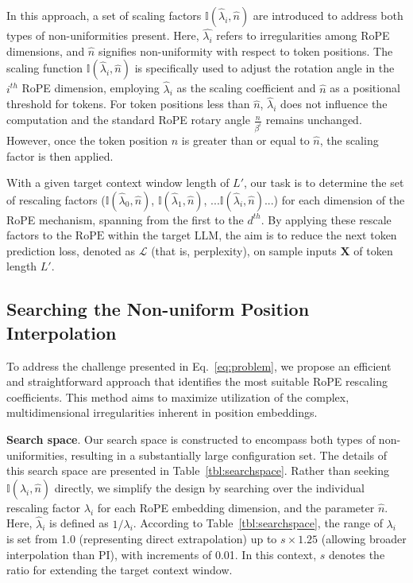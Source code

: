 In this approach, a set of scaling factors $\mathbb{I}(\hat{\lambda}_{i},\hat{n})$ are introduced to address both types of non-uniformities present. Here, $\hat{\lambda_i}$ refers to irregularities among RoPE dimensions, and $\hat{n}$ signifies non-uniformity with respect to token positions. The scaling function $\mathbb{I}(\hat{\lambda}_{i},\hat{n})$ is specifically used to adjust the rotation angle in the $i^{th}$ RoPE dimension, employing $\hat{\lambda}_{i}$ as the scaling coefficient and $\hat{n}$ as a positional threshold for tokens. For token positions less than $\hat{n}$, $\hat{\lambda}_{i}$ does not influence the computation and the standard RoPE rotary angle $\frac{n}{\beta^i}$ remains unchanged. However, once the token position $n$ is greater than or equal to $\hat{n}$, the scaling factor is then applied.

With a given target context window length of $L'$, our task is to determine the set of rescaling factors ($\mathbb{I}(\hat{\lambda}_{0},\hat{n})$, $\mathbb{I}(\hat{\lambda}_{1},\hat{n})$, ...$\mathbb{I}(\hat{\lambda}_{i},\hat{n})$...) for each dimension of the RoPE mechanism, spanning from the first to the $d^{th}$. By applying these rescale factors to the $\text{RoPE}$ within the target $\text{LLM}$, the aim is to reduce the next token prediction loss, denoted as $\mathcal{L}$ (that is, perplexity), on sample inputs $\mathbf{X}$ of token length $L'$.

\subsection{Searching the Non-uniform Position Interpolation}

To address the challenge presented in Eq.~\ref{eq:problem}, we propose an efficient and straightforward approach that identifies the most suitable RoPE rescaling coefficients. This method aims to maximize utilization of the complex, multidimensional irregularities inherent in position embeddings.

\textbf{Search space}. Our search space is constructed to encompass both types of non-uniformities, resulting in a substantially large configuration set. The details of this search space are presented in Table~\ref{tbl:searchspace}. Rather than seeking $\mathbb{I}(\hat{\lambda}_{i},\hat{n})$ directly, we simplify the design by searching over the individual rescaling factor $\lambda_i$ for each RoPE embedding dimension, and the parameter $\hat{n}$. Here, $\hat{\lambda}_{i}$ is defined as $1/\lambda_i$. According to Table~\ref{tbl:searchspace}, the range of $\lambda_i$ is set from 1.0 (representing direct extrapolation) up to $s\times1.25$ (allowing broader interpolation than PI), with increments of 0.01. In this context, $s$ denotes the ratio for extending the target context window.

